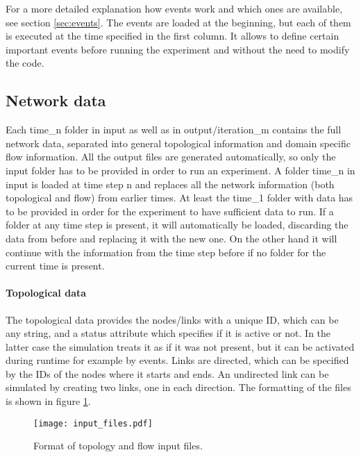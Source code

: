 \documentclass[11pt,fleqn]{book} %
\newcommand{\domain}[1][]{domain#1}
\begin{document}
For a more detailed explanation how events work and which ones are available, see  section \ref{sec:events}. The events are loaded at the beginning, but each of them is executed at the time specified in the first column. It allows to define certain important events before running the experiment and without the need to modify the code. 

\subsection{Network data}
Each time\_n folder in input as well as in output/iteration\_m contains the full network data, separated into general topological information and \domain{} specific flow information. All the output files are generated automatically, so only the input folder has to be provided in order to run an experiment. A folder time\_n in input is loaded at time step n and replaces all the network information (both topological and flow) from earlier times. At least the time\_1 folder with data has to be provided in order for the experiment to have sufficient data to run. If a folder at any time step is present, it will automatically be loaded, discarding the data from before and replacing it with the new one. On the other hand it will continue with the information from the time step before if no folder for the current time is present.

\paragraph{Topological data} The topological data provides the nodes/links with a unique ID, which can be any string, and a status attribute which specifies if it is active or not. In the latter case the simulation treats it as if it was not present, but it can be activated during runtime for example by events. Links are directed, which can be specified by the IDs of the nodes where it starts and ends. An undirected link can be simulated by creating two links, one in each direction. The formatting of the files is shown in figure \ref{fig:input_files}.

\begin{figure}[!h]
\centering\texttt{[image: input\_files.pdf]}
\caption{Format of topology and flow input files.}
\label{fig:input_files}
\end{figure}
\end{document}
